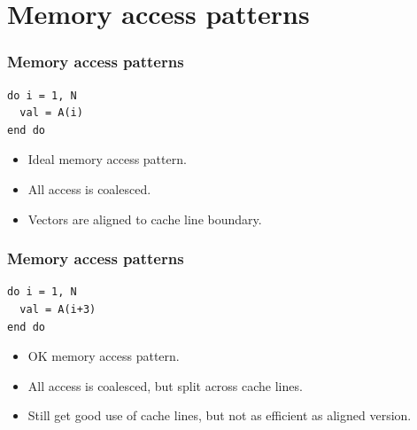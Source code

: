 \documentclass{beamer}
\begin{document}
\section{Memory access patterns}
\begin{frame}[fragile]
\frametitle{Memory access patterns}
\begin{verbatim}
do i = 1, N
  val = A(i)
end do
\end{verbatim}
\begin{adjustbox}{max width={\textwidth}}
\end{adjustbox}
\begin{itemize}
  \item Ideal memory access pattern.
  \item All access is coalesced.
  \item Vectors are aligned to cache line boundary.
\end{itemize}
\end{frame}

\begin{frame}[fragile]
\frametitle{Memory access patterns}
\begin{verbatim}
do i = 1, N
  val = A(i+3)
end do
\end{verbatim}
\begin{adjustbox}{max width={\textwidth}}
\end{adjustbox}
\begin{itemize}
  \item OK memory access pattern.
  \item All access is coalesced, but split across cache lines.
  \item Still get good use of cache lines, but not as efficient as aligned version.
\end{itemize}
\end{frame}
\end{document}
